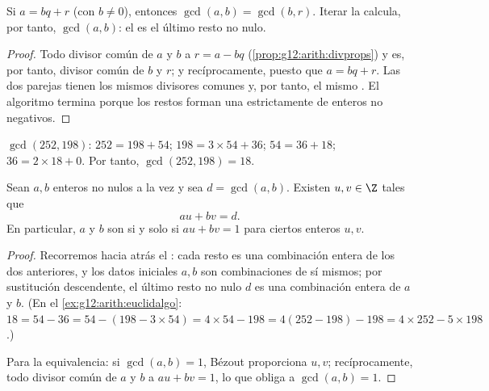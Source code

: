 \begin{proposition}\label{prop:g12:arith:euclidalgo}
Si $a = bq + r$ (con $b \neq 0$), entonces $\gcd(a, b) = \gcd(b, r)$. Iterar
la  calcula, por tanto, $\gcd(a,b)$: el  es el último resto no nulo.
\end{proposition}

\begin{proof}
Todo divisor común de $a$ y $b$  a $r = a - bq$
(\cref{prop:g12:arith:divprops}) y es, por tanto, divisor común de $b$ y
$r$; y recíprocamente, puesto que $a = bq + r$. Las dos parejas tienen los
mismos divisores comunes y, por tanto, el mismo . El
algoritmo termina porque los restos forman una  estrictamente
 de enteros no negativos.
\end{proof}

\begin{example}\label{ex:g12:arith:euclidalgo}
$\gcd(252, 198)$: $252 = 198 + 54$; $198 = 3\times54 + 36$;
$54 = 36 + 18$; $36 = 2 \times 18 + 0$. Por tanto,
$\gcd(252,198) = 18$.
\end{example}

\begin{theorem}\label{thm:g12:arith:bezout}
Sean $a, b$ enteros no nulos a la vez y sea $d = \gcd(a,b)$. Existen
$u, v \in \Z$ tales que
\[
au + bv = d .
\]
En particular, $a$ y $b$ son  si y solo si $au + bv = 1$
para ciertos enteros $u, v$.
\end{theorem}

\begin{proof}
Recorremos hacia atrás el : cada resto es una
combinación entera de los dos anteriores, y los datos iniciales $a, b$ son
combinaciones de sí mismos; por sustitución descendente, el último resto no
nulo $d$ es una combinación entera de $a$ y $b$. (En el
\cref{ex:g12:arith:euclidalgo}:
$18 = 54 - 36 = 54 - (198 - 3\times54) = 4\times54 - 198 =
4(252 - 198) - 198 = 4\times252 - 5\times198$.)

Para la equivalencia: si $\gcd(a,b) = 1$, Bézout proporciona $u, v$;
recíprocamente, todo divisor común de $a$ y $b$  a $au + bv = 1$, lo
que obliga a $\gcd(a,b) = 1$.
\end{proof}

